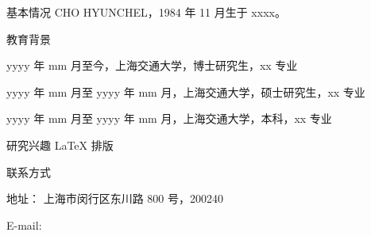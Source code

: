 \begin{resume}
  \begin{resumesection}{基本情况}
    CHO HYUNCHEL，1984 年 11 月生于 xxxx。
  \end{resumesection}

  \begin{resumelist}{教育背景}
    \item yyyy 年 mm 月至今，上海交通大学，博士研究生，xx 专业
    \item yyyy 年 mm 月至 yyyy 年 mm 月，上海交通大学，硕士研究生，xx 专业
    \item yyyy 年 mm 月至 yyyy 年 mm 月，上海交通大学，本科，xx 专业
  \end{resumelist}

  \begin{resumesection}{研究兴趣}
    \LaTeX{} 排版
  \end{resumesection}

  \begin{resumelist}{联系方式}
    \item 地址： 上海市闵行区东川路 800 号，200240
    \item E-mail: 
  \end{resumelist}
\end{resume}
